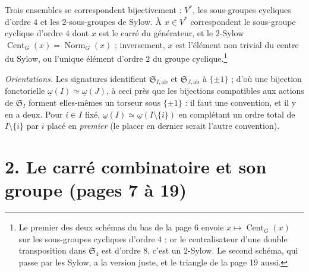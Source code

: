 \documentclass[11pt,a4paper]{article}
\begin{document}
Trois ensembles se correspondent bijectivement : $V^{*}$, les sous-groupes
cycliques d'ordre $4$ et les $2$-sous-groupes de Sylow. À $x \in V^{*}$
correspondent le sous-groupe cyclique d'ordre $4$ dont $x$ est le carré du
générateur, et le $2$-Sylow $\operatorname{Cent}_G(x) = \operatorname{Norm}_G(x)$ ;
inversement, $x$ est l'élément non trivial du centre du Sylow, ou l'unique
élément d'ordre $2$ du groupe cyclique.\footnote{Le premier des deux schémas du
bas de la page 6 envoie $x \mapsto \operatorname{Cent}_G(x)$ sur les
sous-groupes cycliques d'ordre $4$ ; or le centralisateur d'une double
transposition dans $\mathfrak{S}_4$ est d'ordre $8$, c'est un $2$-Sylow. Le
second schéma, qui passe par les Sylow, a la version juste, et le triangle de la
page 19 aussi.}

\emph{Orientations.} Les signatures identifient $\mathfrak{S}_{I,\mathrm{ab}}$
et $\mathfrak{S}_{J,\mathrm{ab}}$ à $\{\pm 1\}$ ; d'où une bijection
fonctorielle $\underline{\omega}(I) \simeq \underline{\omega}(J)$, à ceci près
que les bijections compatibles aux actions de $\mathfrak{S}_I$ forment elles-mêmes
un torseur sous $\{\pm 1\}$ : il faut une convention, et il y en a deux. Pour
$i \in I$ fixé, $\underline{\omega}(I) \simeq \underline{\omega}(I \setminus \{i\})$
en complétant un ordre total de $I \setminus \{i\}$ par $i$ placé en
\emph{premier} (le placer en dernier serait l'autre convention).

\section*{2. Le carré combinatoire et son groupe (pages 7 à 19)}
\end{document}
